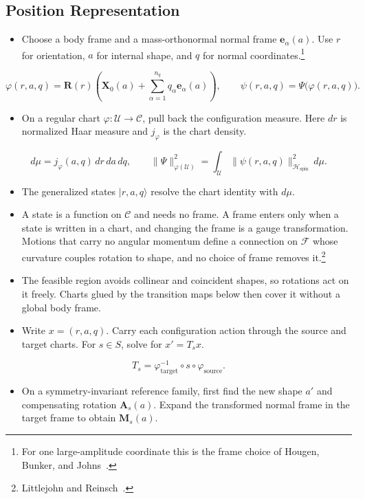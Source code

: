 \documentclass[11pt]{article}
\newcommand{\conf}{\mathcal{C}}
\newcommand{\spin}{\mathcal{H}_{\mathrm{spin}}}
\newcommand{\X}{\mathbf{X}}
\newcommand{\Rmat}{\mathbf{R}}
\begin{document}
\subsection{Position Representation}
\label{sec:position}
\begin{itemize}
\item Choose a body frame and a mass-orthonormal normal frame $\mathbf e_\alpha(a)$.
Use $r$ for orientation, $a$ for internal shape, and $q$ for normal coordinates.\footnote{For one
large-amplitude coordinate this is the frame choice of Hougen, Bunker, and Johns~\cite{HougenBunkerJohns1970}.}
\end{itemize}
\[
\varphi(r,a,q)=\Rmat(r)\left(\X_0(a)+\sum_{\alpha=1}^{n_q}q_\alpha\mathbf e_\alpha(a)\right),
\qquad\psi(r,a,q)=\Psi\bigl(\varphi(r,a,q)\bigr).
\]
\begin{itemize}
\item On a regular chart $\varphi:\mathcal U\to\conf$, pull back the configuration measure.
Here $dr$ is normalized Haar measure and $j_\varphi$ is the chart density.
\end{itemize}
\[
d\mu=j_\varphi(a,q)\,dr\,da\,dq,
\qquad
\|\Psi\|_{\varphi(\mathcal U)}^2
=\int_{\mathcal U}\|\psi(r,a,q)\|_{\spin}^2\,d\mu.
\]
\begin{itemize}
\item The generalized states $|r,a,q\rangle$ resolve the chart identity with $d\mu$.
\item A state is a function on $\conf$ and needs no frame. A frame enters only when a state is written in a
chart, and changing the frame is a gauge transformation. Motions that carry no angular momentum define a
connection on $\mathcal F$ whose curvature couples rotation to shape, and no choice of frame removes
it.\footnote{Littlejohn and Reinsch~\cite{LittlejohnReinsch1997}.}
\item The feasible region avoids collinear and coincident shapes, so rotations act on it freely. Charts glued
by the transition maps below then cover it without a global body frame.
\item Write $x=(r,a,q)$. Carry each configuration action through the
source and target charts. For $s\in S$, solve for $x'=T_sx$.
\end{itemize}
\[
T_s=\varphi_{\mathrm{target}}^{-1}\circ s\circ\varphi_{\mathrm{source}}.
\]
\begin{itemize}
\item On a symmetry-invariant reference family, first find the new
shape $a'$ and compensating rotation $\mathbf A_s(a)$. Expand the transformed
normal frame in the target frame to obtain $\mathbf M_s(a)$.
\end{itemize}
\end{document}
